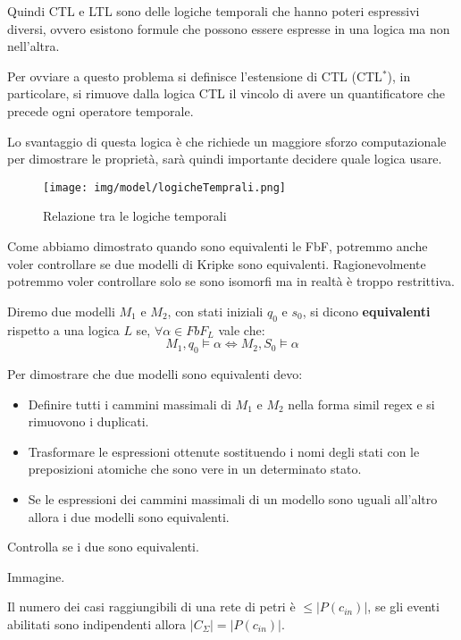 Quindi CTL e LTL sono delle logiche temporali che hanno poteri espressivi diversi,
ovvero esistono formule che possono essere espresse in una logica ma non nell'altra.

Per ovviare a questo problema si definisce l'estensione di CTL (CTL$^\ast$),
in particolare, si rimuove dalla logica CTL il vincolo di avere un quantificatore
che precede ogni operatore temporale.

Lo svantaggio di questa logica è che richiede un maggiore sforzo computazionale
per dimostrare le proprietà, sarà quindi importante decidere quale logica usare.
\begin{figure}[!ht]
    \centering
    \texttt{[image: img/model/logicheTemprali.png]}
    \caption{Relazione tra le logiche temporali}
\end{figure}
Come abbiamo dimostrato quando sono equivalenti le FbF, potremmo anche voler
controllare se due modelli di Kripke sono equivalenti. Ragionevolmente potremmo
voler controllare solo se sono isomorfi ma in realtà è troppo restrittiva.
\begin{definizione}
    Diremo due modelli $M_1$ e $M_2$, con stati iniziali $q_0$ e $s_0$, si dicono
    \textbf{equivalenti} rispetto a una logica $L$ se, $\forall \alpha \in FbF_L$
    vale che:
    \begin{equation}
        M_1, q_0 \models \alpha \iff M_2, S_0 \models \alpha
    \end{equation}
\end{definizione}
Per dimostrare che due modelli sono equivalenti devo:
\begin{itemize}
    \item Definire tutti i cammini massimali di $M_1$ e $M_2$ nella forma simil
          regex e si rimuovono i duplicati.
    \item Trasformare le espressioni ottenute sostituendo i nomi degli stati con
          le preposizioni atomiche che sono vere in un determinato stato.
    \item Se le espressioni dei cammini massimali di un modello sono uguali
          all'altro allora i due modelli sono equivalenti.
\end{itemize}
\begin{esempio} %
    Controlla se i due sono equivalenti.

    Immagine.
\end{esempio}
\begin{nota}
    Il numero dei casi raggiungibili di una rete di petri è $\leq |P(c_{in})|$,
    se gli eventi abilitati sono indipendenti allora $|C_\Sigma| = |P(c_{in})|$.
\end{nota}
